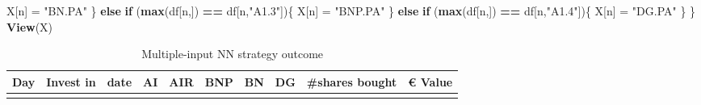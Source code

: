 \documentclass[
  11pt,
]{article}
\newenvironment{Shaded}{\begin{snugshade}}{\end{snugshade}}
\newcommand{\ControlFlowTok}[1]{\textcolor[rgb]{0.13,0.29,0.53}{\textbf{#1}}}
\newcommand{\KeywordTok}[1]{\textcolor[rgb]{0.13,0.29,0.53}{\textbf{#1}}}
\newcommand{\NormalTok}[1]{#1}
\newcommand{\OperatorTok}[1]{\textcolor[rgb]{0.81,0.36,0.00}{\textbf{#1}}}
\newcommand{\StringTok}[1]{\textcolor[rgb]{0.31,0.60,0.02}{#1}}
\begin{document}
\begin{Shaded}
\begin{Highlighting}[]
\NormalTok{    X[n] =}\StringTok{ "BN.PA"}
\NormalTok{  \} }\ControlFlowTok{else} \ControlFlowTok{if}\NormalTok{ (}\KeywordTok{max}\NormalTok{(df[n,]) }\OperatorTok{==}\StringTok{ }\NormalTok{df[n,}\StringTok{"A1.3"}\NormalTok{])\{}
\NormalTok{    X[n] =}\StringTok{ "BNP.PA"}
\NormalTok{  \} }\ControlFlowTok{else} \ControlFlowTok{if}\NormalTok{ (}\KeywordTok{max}\NormalTok{(df[n,]) }\OperatorTok{==}\StringTok{ }\NormalTok{df[n,}\StringTok{"A1.4"}\NormalTok{])\{}
\NormalTok{    X[n] =}\StringTok{ "DG.PA"}
\NormalTok{  \}}
\NormalTok{\}}
\KeywordTok{View}\NormalTok{(X)}
\end{Highlighting}
\end{Shaded}

\begin{longtable}[]{@{}llllllllll@{}}
\caption{Multiple-input NN strategy outcome}\tabularnewline
\toprule
\begin{minipage}[b]{0.04\columnwidth}\raggedright
Day\strut
\end{minipage} & \begin{minipage}[b]{0.09\columnwidth}\raggedright
Invest in\strut
\end{minipage} & \begin{minipage}[b]{0.10\columnwidth}\raggedright
date\strut
\end{minipage} & \begin{minipage}[b]{0.06\columnwidth}\raggedright
AI\strut
\end{minipage} & \begin{minipage}[b]{0.06\columnwidth}\raggedright
AIR\strut
\end{minipage} & \begin{minipage}[b]{0.06\columnwidth}\raggedright
BNP\strut
\end{minipage} & \begin{minipage}[b]{0.06\columnwidth}\raggedright
BN\strut
\end{minipage} & \begin{minipage}[b]{0.06\columnwidth}\raggedright
DG\strut
\end{minipage} & \begin{minipage}[b]{0.13\columnwidth}\raggedright
\#shares bought\strut
\end{minipage} & \begin{minipage}[b]{0.08\columnwidth}\raggedright
€ Value\strut
\end{minipage}\tabularnewline
\midrule
\endfirsthead
\toprule
\begin{minipage}[b]{0.04\columnwidth}\raggedright

\end{minipage}
\end{longtable}
\end{document}
